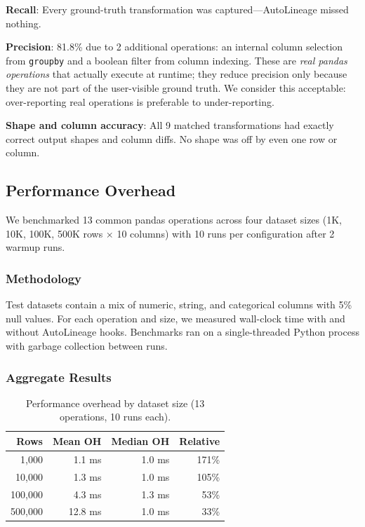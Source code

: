 \documentclass[10pt,twocolumn]{article}
\begin{document}
\textbf{Recall}: Every ground-truth transformation was captured---AutoLineage missed nothing.

\textbf{Precision}: 81.8\% due to 2 additional operations: an internal column selection from \texttt{groupby} and a boolean filter from column indexing. These are \emph{real pandas operations} that actually execute at runtime; they reduce precision only because they are not part of the user-visible ground truth. We consider this acceptable: over-reporting real operations is preferable to under-reporting.

\textbf{Shape and column accuracy}: All 9 matched transformations had exactly correct output shapes and column diffs. No shape was off by even one row or column.

\subsection{Performance Overhead}
\label{sec:perf}

We benchmarked 13 common pandas operations across four dataset sizes (1K, 10K, 100K, 500K rows $\times$ 10 columns) with 10 runs per configuration after 2 warmup runs.

\subsubsection{Methodology}

Test datasets contain a mix of numeric, string, and categorical columns with 5\% null values. For each operation and size, we measured wall-clock time with and without AutoLineage hooks. Benchmarks ran on a single-threaded Python process with garbage collection between runs.

\subsubsection{Aggregate Results}

\begin{table}[t]
\centering
\caption{Performance overhead by dataset size (13 operations, 10 runs each).}
\label{tab:benchmarks}
\small
\begin{tabular}{@{}rrrr@{}}
\toprule
\textbf{Rows} & \textbf{Mean OH} & \textbf{Median OH} & \textbf{Relative} \\
\midrule
1,000 & 1.1 ms & 1.0 ms & 171\% \\
10,000 & 1.3 ms & 1.0 ms & 105\% \\
100,000 & 4.3 ms & 1.3 ms & 53\% \\
500,000 & 12.8 ms & 1.0 ms & 33\% \\
\bottomrule
\end{tabular}
\end{table}
\end{document}
